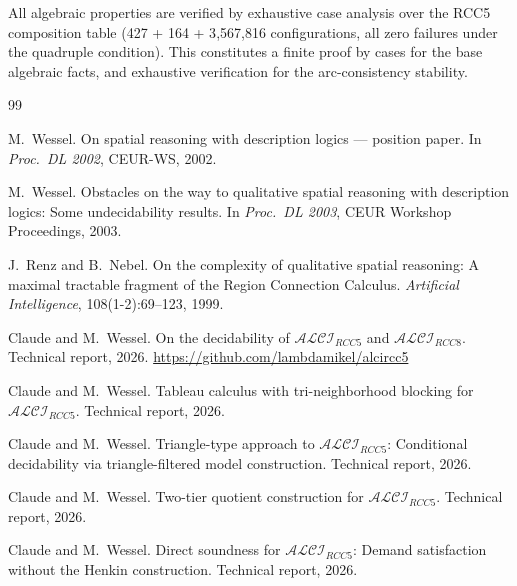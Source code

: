 \documentclass[a4paper,11pt]{article}
\theoremstyle{definition}
\begin{document}
All algebraic properties are verified by exhaustive case analysis
over the RCC5 composition table (427 + 164 + 3{,}567{,}816
configurations, all zero failures under the quadruple condition).
This constitutes a finite proof by cases for the base algebraic
facts, and exhaustive verification for the arc-consistency stability.


\begin{thebibliography}{99}

M.~Wessel.
\newblock On spatial reasoning with description logics --- position paper.
\newblock In \emph{Proc.\ DL 2002}, CEUR-WS, 2002.

M.~Wessel.
\newblock Obstacles on the way to qualitative spatial reasoning with
  description logics: Some undecidability results.
\newblock In \emph{Proc.\ DL 2003}, CEUR Workshop Proceedings, 2003.

J.~Renz and B.~Nebel.
\newblock On the complexity of qualitative spatial reasoning: A maximal
  tractable fragment of the Region Connection Calculus.
\newblock \emph{Artificial Intelligence}, 108(1-2):69--123, 1999.

Claude and M.~Wessel.
\newblock On the decidability of $\mathcal{ALCI}_{\mathit{RCC5}}$ and
  $\mathcal{ALCI}_{\mathit{RCC8}}$.
\newblock Technical report, 2026.
\newblock \url{https://github.com/lambdamikel/alcircc5}

Claude and M.~Wessel.
\newblock Tableau calculus with tri-neighborhood blocking for
  $\mathcal{ALCI}_{\mathit{RCC5}}$.
\newblock Technical report, 2026.

Claude and M.~Wessel.
\newblock Triangle-type approach to $\mathcal{ALCI}_{\mathit{RCC5}}$:
  Conditional decidability via triangle-filtered model construction.
\newblock Technical report, 2026.

Claude and M.~Wessel.
\newblock Two-tier quotient construction for $\mathcal{ALCI}_{\mathit{RCC5}}$.
\newblock Technical report, 2026.

Claude and M.~Wessel.
\newblock Direct soundness for $\mathcal{ALCI}_{\mathit{RCC5}}$:
  Demand satisfaction without the Henkin construction.
\newblock Technical report, 2026.

\end{thebibliography}
\end{document}
